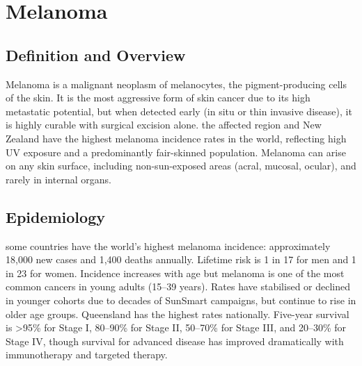 \chapter{Melanoma}

\section*{Definition and Overview}
Melanoma is a malignant neoplasm of melanocytes, the pigment-producing cells of the skin. It is the most aggressive form of skin cancer due to its high metastatic potential, but when detected early (in situ or thin invasive disease), it is highly curable with surgical excision alone. the affected region and New Zealand have the highest melanoma incidence rates in the world, reflecting high UV exposure and a predominantly fair-skinned population. Melanoma can arise on any skin surface, including non-sun-exposed areas (acral, mucosal, ocular), and rarely in internal organs.

\section*{Epidemiology}
some countries have the world's highest melanoma incidence: approximately 18,000 new cases and 1,400 deaths annually. Lifetime risk is 1 in 17 for men and 1 in 23 for women. Incidence increases with age but melanoma is one of the most common cancers in young adults (15--39 years). Rates have stabilised or declined in younger cohorts due to decades of SunSmart campaigns, but continue to rise in older age groups. Queensland has the highest rates nationally. Five-year survival is >95\% for Stage I, 80--90\% for Stage II, 50--70\% for Stage III, and 20--30\% for Stage IV, though survival for advanced disease has improved dramatically with immunotherapy and targeted therapy.

